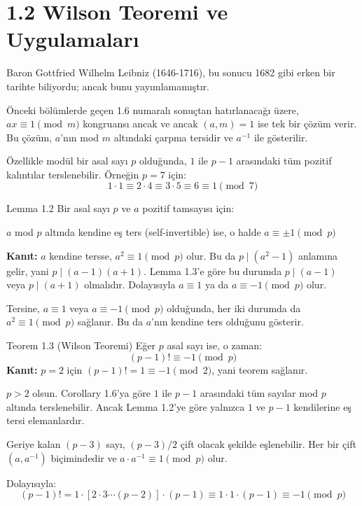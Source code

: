 \documentclass[12pt]{article}
\begin{document}
\section*{1.2 Wilson Teoremi ve Uygulamaları}

Baron Gottfried Wilhelm Leibniz (1646-1716), bu sonucu 1682 gibi erken bir tarihte biliyordu; ancak bunu yayımlamamıştır.

Önceki bölümlerde geçen 1.6 numaralı sonuçtan hatırlanacağı üzere, $ax \equiv 1 \pmod{m}$ kongruansı ancak ve ancak $(a, m) = 1$ ise tek bir çözüm verir. Bu çözüm, $a$'nın mod $m$ altındaki çarpma tersidir ve $a^{-1}$ ile gösterilir.

Özellikle modül bir asal sayı $p$ olduğunda, $1$ ile $p-1$ arasındaki tüm pozitif kalıntılar terslenebilir.  
Örneğin $p = 7$ için:
\[
1 \cdot 1 \equiv 2 \cdot 4 \equiv 3 \cdot 5 \equiv 6 \equiv 1 \pmod{7}
\]

\begin{theorembox}{Lemma 1.2}
Bir asal sayı $p$ ve $a$ pozitif tamsayısı için:

$a$ mod $p$ altında kendine eş ters (self-invertible) ise, o halde $a \equiv \pm 1 \pmod{p}$

\textbf{Kanıt:}  
$a$ kendine tersse, $a^2 \equiv 1 \pmod{p}$ olur. Bu da $p \mid (a^2 - 1)$ anlamına gelir, yani $p \mid (a - 1)(a + 1)$. Lemma 1.3'e göre bu durumda $p \mid (a - 1)$ veya $p \mid (a + 1)$ olmalıdır. Dolayısıyla $a \equiv 1$ ya da $a \equiv -1 \pmod{p}$ olur.

Tersine, $a \equiv 1$ veya $a \equiv -1 \pmod{p}$ olduğunda, her iki durumda da $a^2 \equiv 1 \pmod{p}$ sağlanır. Bu da $a$'nın kendine ters olduğunu gösterir.
\end{theorembox}

\begin{theorembox}{Teorem 1.3 (Wilson Teoremi)}
Eğer $p$ asal sayı ise, o zaman:
\[
(p - 1)! \equiv -1 \pmod{p}
\]
\textbf{Kanıt:}  
$p = 2$ için $(p - 1)! = 1 \equiv -1 \pmod{2}$, yani teorem sağlanır.

$p > 2$ olsun. Corollary 1.6'ya göre $1$ ile $p - 1$ arasındaki tüm sayılar mod $p$ altında terslenebilir. Ancak Lemma 1.2'ye göre yalnızca $1$ ve $p - 1$ kendilerine eş tersi elemanlardır.

Geriye kalan $(p - 3)$ sayı, $(p - 3)/2$ çift olacak şekilde eşlenebilir. Her bir çift $(a, a^{-1})$ biçimindedir ve $a \cdot a^{-1} \equiv 1 \pmod{p}$ olur.

Dolayısıyla:
\[
(p - 1)! = 1 \cdot [2 \cdot 3 \cdots (p - 2)] \cdot (p - 1)
\equiv 1 \cdot 1 \cdot (p - 1) \equiv -1 \pmod{p}
\]
\end{theorembox}
\end{document}
